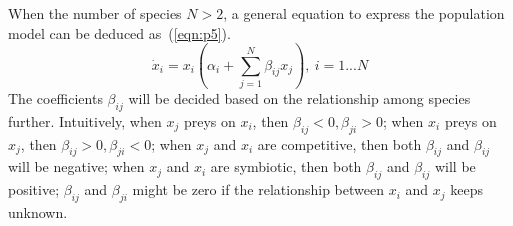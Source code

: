 When the number of species $N>2$, a general equation to express the population model can be deduced as~(\ref{eqn:p5}).
\begin{equation}\label{eqn:p5}
   \dot{x}_i = x_i(\alpha_i+ \sum_{j=1}^{N} \beta_{ij}x_j), ~i=1...N
\end{equation}
The coefficients $\beta_{ij}$ will be decided based on the relationship among species further. Intuitively, when $x_j$ preys on $x_i$, then $\beta_{ij}<0, \beta_{ji}>0$; when $x_i$ preys on $x_j$, then $\beta_{ij}>0, \beta_{ji}<0$; when $x_j$ and $x_i$ are competitive, then both $\beta_{ij}$ and $\beta_{ij}$ will be negative; when $x_j$ and $x_i$ are symbiotic, then both $\beta_{ij}$ and $\beta_{ij}$ will be positive; $\beta_{ij}$ and $\beta_{ji}$ might be zero if the relationship between $x_i$ and $x_j$ keeps unknown. 